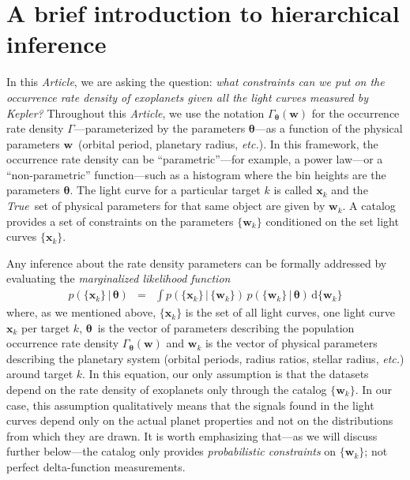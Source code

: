 \documentclass[12pt,preprint]{aastex}
\newcommand{\project}[1]{{\sffamily #1}}
\newcommand{\kepler}{\project{Kepler}}
\newcommand{\paper}{\textsl{Article}}
\newcommand{\foreign}[1]{\emph{#1}}
\newcommand{\etc}{\foreign{etc.}}
\newcommand{\True}{\foreign{True}}
\newcommand{\eqlabel}[1]{\label{eq:#1}}
\newcommand{\dd}{\ensuremath{\,\mathrm{d}}}
\newcommand{\bvec}[1]{\ensuremath{\boldsymbol{#1}}}
\newcommand{\rate}{\ensuremath{\Gamma}}
\newcommand{\ratepar}{{\ensuremath{\theta}}}
\newcommand{\ratepars}{{\ensuremath{\bvec{\ratepar}}}}
\newcommand{\data}{{\ensuremath{\bvec{x}}}}
\newcommand{\entry}{{\ensuremath{\bvec{w}}}}
\begin{document}
\section{A brief introduction to hierarchical inference}

In this \paper, we are asking the question: \emph{what constraints can we put
on the occurrence rate density of exoplanets given all the light curves
measured by \kepler?}
Throughout this \paper, we use the notation $\rate_\ratepars(\entry)$ for the
occurrence rate density \rate---parameterized by the parameters \ratepars---as
a function of the physical parameters \entry\ (orbital period, planetary
radius, \etc).
In this framework, the occurrence rate density can be ``parametric''---for
example, a power law---or a ``non-parametric'' function---such as a histogram
where the bin heights are the parameters \ratepars.
The light curve for a particular target $k$ is called $\data_k$ and the
\True\ set of physical parameters for that same object are given by
$\entry_k$.
A catalog provides a set of constraints on the parameters $\{\entry_k\}$
conditioned on the set light curves $\{\data_k\}$.

Any inference about the rate density parameters can be formally addressed by
evaluating the \emph{marginalized likelihood function}
\begin{eqnarray}\eqlabel{crazylike}
p(\{\data_k\}\,|\,\ratepars) &=&
    \int p(\{\data_k\}\,|\,\{\entry_k\})
    \,p(\{\entry_k\}\,|\,\ratepars)
    \dd\{\entry_k\}
\end{eqnarray}
where, as we mentioned above, $\{\data_k\}$ is the set of all light curves,
one light curve $\data_k$ per target $k$, \ratepars\ is the vector of
parameters describing the population occurrence rate density
$\rate_\ratepars(\entry)$ and $\entry_k$ is the vector of physical parameters
describing the planetary system (orbital periods, radius ratios, stellar
radius, \etc) around target $k$.
In this equation, our only assumption is that the datasets depend on the
rate density of exoplanets only through the catalog $\{\entry_k\}$.
In our case, this assumption qualitatively means that the signals found in the
light curves depend only on the actual planet properties and not on the
distributions from which they are drawn.
It is worth emphasizing that---as we will discuss further below---the catalog
only provides \emph{probabilistic constraints} on $\{\entry_k\}$; not perfect
delta-function measurements.
\end{document}
